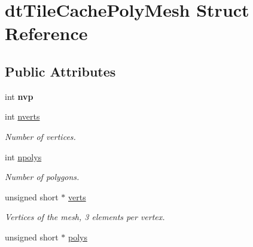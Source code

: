 \hypertarget{structdtTileCachePolyMesh}{}\section{dt\+Tile\+Cache\+Poly\+Mesh Struct Reference}
\label{structdtTileCachePolyMesh}
\subsection*{Public Attributes}
\begin{DoxyCompactItemize}
\item 
\mbox{\label{structdtTileCachePolyMesh_adc3ecbab9e04c96d87b1ad4fbad439aa}} 
int {\bfseries nvp}
\item 
\mbox{\label{structdtTileCachePolyMesh_a369808f1d748df877916ad7d66ea38a1}} 
int \hyperlink{structdtTileCachePolyMesh_a369808f1d748df877916ad7d66ea38a1}{nverts}
\begin{DoxyCompactList}\small\item\em Number of vertices. \end{DoxyCompactList}\item 
\mbox{\label{structdtTileCachePolyMesh_a19b929513482da73c5abf7aba98b46e8}} 
int \hyperlink{structdtTileCachePolyMesh_a19b929513482da73c5abf7aba98b46e8}{npolys}
\begin{DoxyCompactList}\small\item\em Number of polygons. \end{DoxyCompactList}\item 
\mbox{\label{structdtTileCachePolyMesh_a86fc224e1caf49e152a825cbb92fcc44}} 
unsigned short $\ast$ \hyperlink{structdtTileCachePolyMesh_a86fc224e1caf49e152a825cbb92fcc44}{verts}
\begin{DoxyCompactList}\small\item\em Vertices of the mesh, 3 elements per vertex. \end{DoxyCompactList}\item 
\mbox{\label{structdtTileCachePolyMesh_a4d08e322db84660159e6327c6534312b}} 
unsigned short $\ast$ \hyperlink{structdtTileCachePolyMesh_a4d08e322db84660159e6327c6534312b}{polys}

\end{DoxyCompactItemize}
